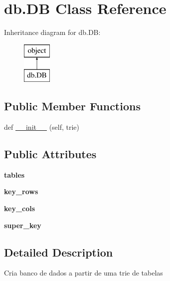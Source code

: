 \hypertarget{classdb_1_1_d_b}{}\section{db.\+DB Class Reference}
\label{classdb_1_1_d_b}
Inheritance diagram for db.\+DB\+:\begin{figure}[H]
\begin{center}
\leavevmode
\includegraphics[height=2.000000cm]{classdb_1_1_d_b}
\end{center}
\end{figure}
\subsection*{Public Member Functions}
\begin{DoxyCompactItemize}
\item 
def \mbox{\hyperlink{classdb_1_1_d_b_af1e6dda03c0f1c1a5bf4b993865a5b3a}{\+\_\+\+\_\+init\+\_\+\+\_\+}} (self, trie)
\end{DoxyCompactItemize}
\subsection*{Public Attributes}
\begin{DoxyCompactItemize}
\item 
\mbox{\label{classdb_1_1_d_b_afa64c6cf6218f2423e0894a5cf0102bb}} 
{\bfseries tables}
\item 
\mbox{\label{classdb_1_1_d_b_a5993ee8357b3bb993484d83a98a8b828}} 
{\bfseries key\+\_\+rows}
\item 
\mbox{\label{classdb_1_1_d_b_ad162712835b5eb50f3cce0bfd39ba244}} 
{\bfseries key\+\_\+cols}
\item 
\mbox{\label{classdb_1_1_d_b_a47d36e897b9f59edde9fdc23e0d9a5f0}} 
{\bfseries super\+\_\+key}
\end{DoxyCompactItemize}


\subsection{Detailed Description}
\begin{DoxyVerb}Cria banco de dados a partir de uma trie de tabelas\end{DoxyVerb}
 

